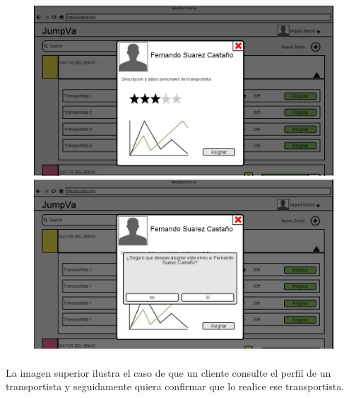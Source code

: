 \documentclass[10pt, a4paper,spanish]{article}
\begin{document}
			\begin{figure}[H]
				\centering
				\begin{minipage}[b]{0.49\textwidth}
					\includegraphics[width=\textwidth]{res/DetallesTransportista.png}
				\end{minipage}
				\begin{minipage}[b]{0.49\textwidth}
					\includegraphics[width=\textwidth]{res/ConfirmacionAsignacion.png}
				\end{minipage}
			\end{figure}

			\paragraph{}
			La imagen superior ilustra el caso de que un cliente consulte el perfil de un transportista y seguidamente quiera confirmar que lo realice ese transportista.
\end{document}
